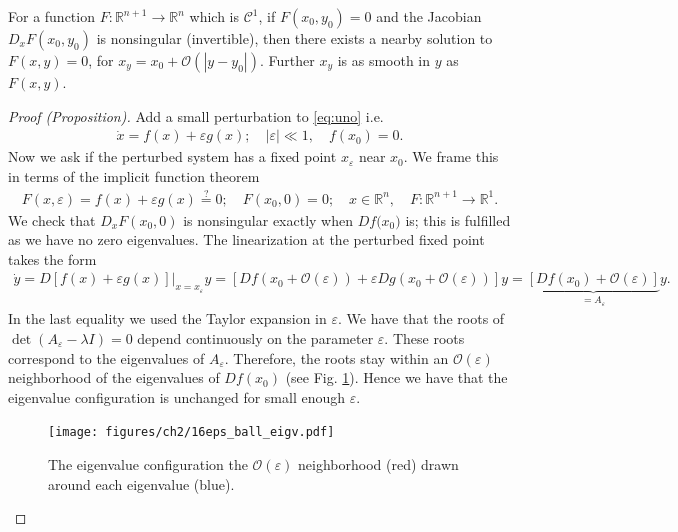 \begin{theorem}
	For a function $F:\mathbb{R}^{n+1} \to \mathbb{R}^{n}$ which is $\mathcal{C}^1$, if  $F( {x_0} , y_0 ) = 0$ and the Jacobian $D_{{x} }F({x_0} , y_0 )$ is nonsingular (invertible), then there exists a nearby solution to $F({x} , y )=0 $, for ${x_y} = {x_0}  + \mathcal{O}(|y-y_0|)$. Further ${x_y} $ is as smooth in $y$ as $F({x} ,y)$.
\end{theorem}

\begin{proof}[Proof (Proposition)]
	Add a small perturbation to \eqref{eq:uno} i.e.
\begin{align}
	\dot{{x} } = f({x}) + \varepsilon g({x} );\quad |\varepsilon | \ll 1,\quad f({x} _0) =0.
\end{align}
Now we ask if the perturbed system has a fixed point ${x} _{\varepsilon}$ near ${x} _0$. We frame this in terms of the implicit function theorem
\begin{align}
	F({x} ,\varepsilon) = f({x} ) + \varepsilon g({x} ) \stackrel{?}{=} 0;\quad F({x}_0, 0) = 0;\quad {x} \in \mathbb{R}^{n}, \quad F:\mathbb{R}^{n+1} \to \mathbb{R}^{1}.
\end{align}
We check that $D_{{x} }F({x_0} ,0) $ is nonsingular exactly when $Df({x_0)} $ is; this is fulfilled as we have no zero eigenvalues. The linearization at the perturbed fixed point takes the form
\begin{align}
	\dot{{y} } = D \left. \left[ f({x} ) + \varepsilon g({x} ) \right]\right|_{{x} = {x_\varepsilon} }{y} = \left[ Df({x_0}  + \mathcal{O}(\varepsilon)) + \varepsilon Dg({x_0} + \mathcal{O}(\varepsilon)) \right] {y} 
		=\underbrace{ \left[ Df({x_0})+ \mathcal{O}(\varepsilon) \right]}_{={A_{\varepsilon}} }{y}.
\end{align}
In the last equality we used the Taylor expansion in $\varepsilon$. We have that the roots of $\det({A_{\varepsilon}}-\lambda {I} ) = 0 $ depend continuously on the parameter $\varepsilon$. These roots correspond to the eigenvalues of $A_{\varepsilon}$. Therefore, the roots stay within an $\mathcal{O}(\varepsilon)$ neighborhood of the eigenvalues of $Df({x_0} )$ (see Fig. \ref{fig:eps_ball_eigv}). Hence we have that the eigenvalue configuration is unchanged for small enough $\varepsilon$.
\begin{figure}[h!]
	\centering
	\texttt{[image: figures/ch2/16eps\_ball\_eigv.pdf]}
	\caption{The eigenvalue configuration the $\mathcal{O}(\varepsilon)$ neighborhood (red) drawn around each eigenvalue (blue).}
	\label{fig:eps_ball_eigv}
\end{figure}
\end{proof}
